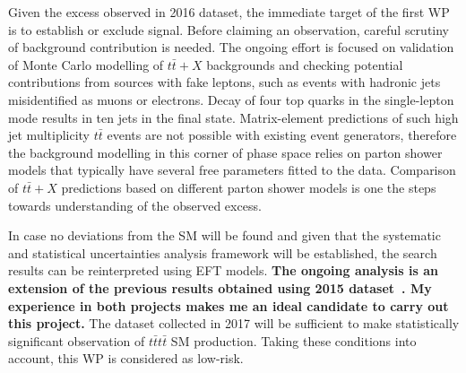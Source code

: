 \textcolor{\mycolor}{
Given the excess observed in 2016 dataset, the immediate target of the first WP is to establish or exclude signal. Before claiming an observation, careful scrutiny of background contribution is needed. The ongoing effort is focused on validation of Monte Carlo modelling of $t\bar{t}+X$ backgrounds and checking potential contributions from sources with fake leptons, such as events with hadronic jets misidentified as muons or electrons. Decay of four top quarks in the single-lepton mode results in ten jets in the final state. Matrix-element predictions of such high jet multiplicity $t\bar{t}$ events are not possible with existing event generators, therefore the background modelling in this corner of phase space relies on parton shower models that typically have several free parameters fitted to the data. Comparison of $t\bar{t}+X$ predictions based on different parton shower models is one the steps towards understanding of the observed excess.}

\textcolor{\mycolor}{
In case no deviations from the SM will be found and given that the systematic and statistical uncertainties analysis framework will be established, the search results can be reinterpreted using EFT models. \textbf{The ongoing analysis is an extension of the previous results obtained using 2015 dataset~\cite{Sirunyan:2017tep}. My experience in both projects makes me an ideal candidate to carry out this project.} The dataset collected in 2017 will be sufficient to make statistically significant observation of $t\bar{t}t\bar{t}$ SM production. Taking these conditions into account, this WP is considered as low-risk.
}
